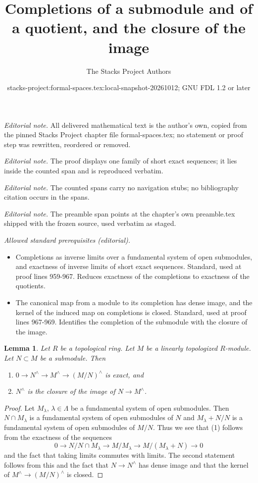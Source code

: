 \documentclass{stacks-project}
\title{Completions of a submodule and of a quotient, and the closure of the image}
\author{The Stacks Project Authors}
\date{stacks-project:formal-spaces.tex:local-snapshot-20261012; GNU FDL 1.2 or later}
\theoremstyle{plain}
\newtheorem{lemma}[subsection]{Lemma}
\theoremstyle{definition}
\theoremstyle{remark}
\numberwithin{equation}{subsection}
\begin{document}
\maketitle
\noindent\textit{Editorial note.} All delivered mathematical text is the author's own, copied from the pinned Stacks Project chapter file formal-spaces.tex; no statement or proof step was rewritten, reordered or removed.\par\medskip
\noindent\textit{Editorial note.} The proof displays one family of short exact sequences; it lies inside the counted span and is reproduced verbatim.\par\medskip
\noindent\textit{Editorial note.} The counted spans carry no navigation stubs; no bibliography citation occurs in the spans.\par\medskip
\noindent\textit{Editorial note.} The preamble span points at the chapter's own preamble.tex shipped with the frozen source, used verbatim as staged.\par\medskip
\noindent\textit{Allowed standard prerequisites (editorial).}\begin{itemize}
\item Completions as inverse limits over a fundamental system of open submodules, and exactness of inverse limits of short exact sequences. Standard, used at proof lines 959-967. Reduces exactness of the completions to exactness of the quotients.
\item The canonical map from a module to its completion has dense image, and the kernel of the induced map on completions is closed. Standard, used at proof lines 967-969. Identifies the completion of the submodule with the closure of the image.
\end{itemize}\medskip
\begin{lemma}
\label{lemma-closure}
Let $R$ be a topological ring. Let $M$ be a linearly topologized
$R$-module. Let $N \subset M$ be a submodule. Then
\begin{enumerate}
\item $0 \to N^\wedge \to M^\wedge \to (M/N)^\wedge$ is exact, and
\item $N^\wedge$ is the closure of the image of $N \to M^\wedge$.
\end{enumerate}
\end{lemma}

\begin{proof}
Let $M_\lambda$, $\lambda \in \Lambda$ be a fundamental system of
open submodules. Then $N \cap M_\lambda$ is a fundamental system
of open submodules of $N$ and $M_\lambda + N/N$ is a fundamental system
of open submodules of $M/N$. Thus we see that (1) follows from
the exactness of the sequences
$$
0 \to N/N \cap M_\lambda \to M/M_\lambda \to M/(M_\lambda + N) \to 0
$$
and the fact that taking limits commutes with limits. The second
statement follows from this and the fact that $N \to N^\wedge$
has dense image and that the kernel of $M^\wedge \to (M/N)^\wedge$ is closed.
\end{proof}
\end{document}

